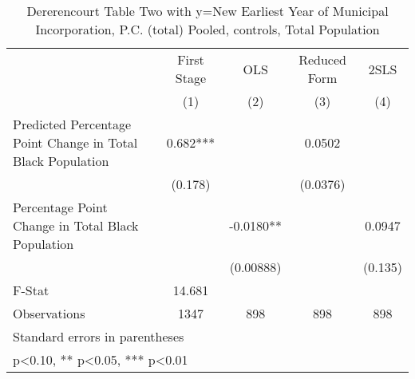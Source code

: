 \begin{table}[htbp]\centering
\def\sym#1{\ifmmode^{#1}\else\(^{#1}\)\fi}
\caption{Dererencourt Table Two with y=New Earliest Year of Municipal Incorporation, P.C. (total)  Pooled,  controls, Total Population}
\begin{tabular}{l*{4}{c}}
\toprule
                    & First Stage   &         OLS   &Reduced Form   &        2SLS   \\
                    &\multicolumn{1}{c}{(1)}   &\multicolumn{1}{c}{(2)}   &\multicolumn{1}{c}{(3)}   &\multicolumn{1}{c}{(4)}   \\
\midrule
Predicted Percentage Point Change in Total Black Population&       0.682***&               &      0.0502   &               \\
                    &     (0.178)   &               &    (0.0376)   &               \\
\addlinespace
Percentage Point Change in Total Black Population&               &     -0.0180** &               &      0.0947   \\
                    &               &   (0.00888)   &               &     (0.135)   \\
\midrule
F-Stat              &      14.681   &               &               &               \\
Observations        &        1347   &         898   &         898   &         898   \\
\bottomrule
\multicolumn{5}{l}{\footnotesize Standard errors in parentheses}\\
\multicolumn{5}{l}{\footnotesize * p<0.10, ** p<0.05, *** p<0.01}\\
\end{tabular}
\end{table}
